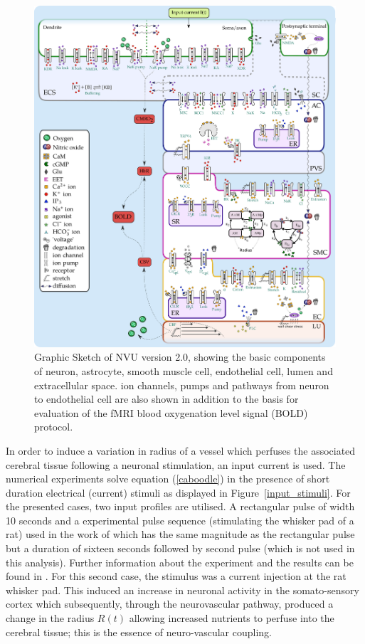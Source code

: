 \documentclass[smallextended]{svjour3}
\numberwithin{equation}{section}
\begin{document}
\begin{figure}[h!]
\centering
\includegraphics[width=0.7\linewidth]{Figures/nvu_20}
\caption[Graphic Sketch of NVU version 2.0]{Graphic Sketch of NVU version 2.0, showing the basic components of neuron, astrocyte, smooth muscle cell, endothelial cell, lumen and extracellular space. ion channels, pumps and pathways from neuron to endothelial cell are also shown in addition to the basis for evaluation of the fMRI blood oxygenation level signal (BOLD) protocol.}
\label{fig:nvu20}
\end{figure}

In order to induce a variation in radius of a vessel which perfuses the associated cerebral tissue following a neuronal stimulation, an input current is used. The numerical experiments solve equation (\ref{caboodle}) in the presence of short duration electrical (current) stimuli as displayed in Figure~\ref{input_stimuli}. For the presented cases, two input profiles are utilised. A rectangular pulse of width 10 seconds and a experimental pulse sequence (stimulating the whisker pad of a rat) used in the work of \cite{Zheng2010} which has the same magnitude as the rectangular pulse but a duration of sixteen seconds followed by second pulse (which is not used in this analysis). Further information about the experiment and the results can be found in \cite{Zheng2010}.  For this second case, the stimulus was a current injection at the rat whisker pad. This induced an increase in neuronal activity in the somato-sensory cortex which subsequently, through the neurovascular pathway, produced a  change in the radius $R(t)$ allowing increased nutrients to perfuse into the cerebral tissue; this is  the essence of neuro-vascular coupling. 
\end{document}
